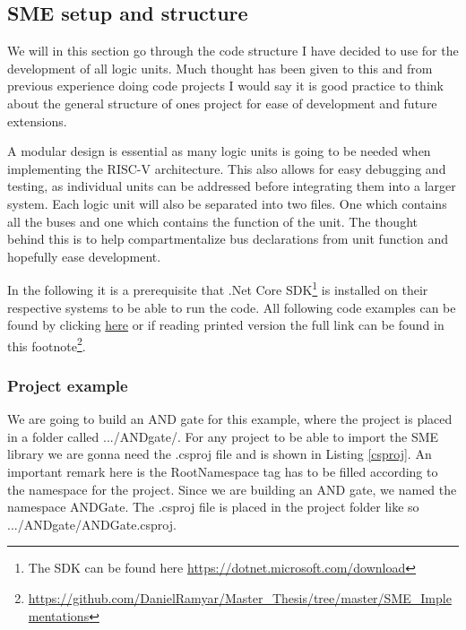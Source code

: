     \subsection{SME setup and structure}
        We will in this section go through the code structure I have decided to use for the development of all logic units. Much thought has been given to this and from previous experience doing code projects I would say it is good practice to think about the general structure of ones project for ease of development and future extensions.
        
        A modular design is essential as many logic units is going to be needed when implementing the RISC-V architecture. This also allows for easy debugging and testing, as individual units can be addressed before integrating them into a larger system. Each logic unit will also be separated into two files. One which contains all the buses and one which contains the function of the unit. The thought behind this is to help compartmentalize bus declarations from unit function and hopefully ease development.  
        
        In the following it is a prerequisite that .Net Core SDK\footnote{The SDK can be found here \url{https://dotnet.microsoft.com/download}} is installed on their respective systems to be able to run the code. All following code examples can be found by clicking \href{https://github.com/DanielRamyar/Master_Thesis/tree/master/SME_Implementations}{here} or if reading printed version the full link can be found in this footnote\footnote{\url{https://github.com/DanielRamyar/Master_Thesis/tree/master/SME_Implementations}}.
        
        \subsubsection{Project example}
        We are going to build an AND gate for this example, where the project is placed in a folder called .../ANDgate/.
        For any project to be able to import the SME library we are gonna need the .csproj file and is shown in Listing \ref{csproj}. An important remark here is the RootNamespace tag has to be filled according to the namespace for the project. Since we are building an AND gate, we named the namespace ANDGate. The .csproj file is placed in the project folder like so .../ANDgate/ANDGate.csproj.
        
